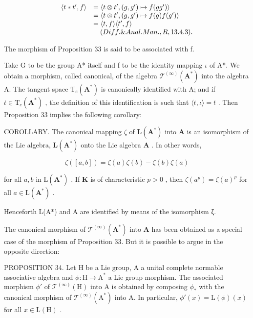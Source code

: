 \[
\begin{array}{r l} \langle t * t ^ {\prime}, f \rangle & = \langle t \otimes t ^ {\prime}, (g, g ^ {\prime}) \mapsto f (g g ^ {\prime}) \rangle \\ & = \langle t \otimes t ^ {\prime}, (g, g ^ {\prime}) \mapsto f (g) f (g ^ {\prime}) \rangle \\ & = \langle t, f \rangle \langle t ^ {\prime}, f \rangle \\ & \quad (Diff. \& Anal. Man., R, 13.4.3). \end{array}
\]

The morphism of Proposition 33 is said to be associated with f.

Take G to be the group A* itself and f to be the identity mapping \(\iota\) of A*. We obtain a morphism, called canonical, of the algebra \(\mathcal{T}^{(\infty)}(\mathbf{A}^*)\) into the algebra A. The tangent space \(\mathrm{T}_{e}(\mathbf{A}^*)\) is canonically identified with A; and if \(t \in \mathrm{T}_{e}(\mathbf{A}^*)\) , the definition of this identification is such that \(\langle t, \iota \rangle = t\) . Then Proposition 33 implies the following corollary:

COROLLARY. The canonical mapping \(\zeta\) of \(\mathbf{L}(\mathbf{A}^{*})\) into \(\mathbf{A}\) is an isomorphism of the Lie algebra, \(\mathbf{L}(\mathbf{A}^{*})\) onto the Lie algebra \(\mathbf{A}\) . In other words,

\[
\zeta ([ a, b ]) = \zeta (a) \zeta (b) - \zeta (b) \zeta (a)
\]

for all \(a, b\) in \(\mathrm{L}(\mathbf{A}^*)\) . If \(\mathbf{K}\) is of characteristic \(p > 0\) , then \(\zeta(a^p) = \zeta(a)^p\) for all \(a \in \mathrm{L}(\mathbf{A}^*)\) .

Henceforth L(A*) and A are identified by means of the isomorphism ζ.

The canonical morphism of \(\mathcal{T}^{(\infty)}(\mathbf{A}^*)\) into \(\mathbf{A}\) has been obtained as a special case of the morphism of Proposition 33. But it is possible to argue in the opposite direction:

PROPOSITION 34. Let H be a Lie group, A a unital complete normable associative algebra and \(\phi: \mathrm{H} \to \mathrm{A}^*\) a Lie group morphism. The associated morphism \(\phi'\) of \(\mathcal{T}^{(\infty)}(\mathrm{H})\) into A is obtained by composing \(\phi_*\) with the canonical morphism of \(\mathcal{T}^{(\infty)}(\mathrm{A}^*)\) into A. In particular, \(\phi'(x) = \mathrm{L}(\phi)(x)\) for all \(x \in \mathrm{L}(\mathrm{H})\) .

